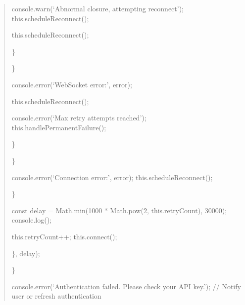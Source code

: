 \documentclass[letterpaper,10pt,english]{sphinxmanual}
\begin{document}
\begin{quote}
\begin{description}
\begin{description}
\sphinxAtStartPar
console.warn(‘Abnormal closure, attempting reconnect’);
this.scheduleReconnect();

\sphinxAtStartPar
this.scheduleReconnect();

\end{description}

\sphinxAtStartPar
\}

\end{description}

\sphinxAtStartPar
\}
\begin{description}
\sphinxAtStartPar
console.error(‘WebSocket error:’, error);
\begin{description}
\sphinxAtStartPar
this.scheduleReconnect();

\sphinxAtStartPar
console.error(‘Max retry attempts reached’);
this.handlePermanentFailure();

\end{description}

\sphinxAtStartPar
\}

\end{description}

\sphinxAtStartPar
\}
\begin{description}
\sphinxAtStartPar
console.error(‘Connection error:’, error);
this.scheduleReconnect();

\end{description}

\sphinxAtStartPar
\}
\begin{description}
\sphinxAtStartPar
const delay = Math.min(1000 * Math.pow(2, this.retryCount), 30000);
console.log();
\begin{description}
\sphinxAtStartPar
this.retryCount++;
this.connect();

\end{description}

\sphinxAtStartPar
\}, delay);

\end{description}

\sphinxAtStartPar
\}
\begin{description}
\sphinxAtStartPar
console.error(‘Authentication failed. Please check your API key.’);
// Notify user or refresh authentication


\end{description}
\end{quote}
\end{document}
